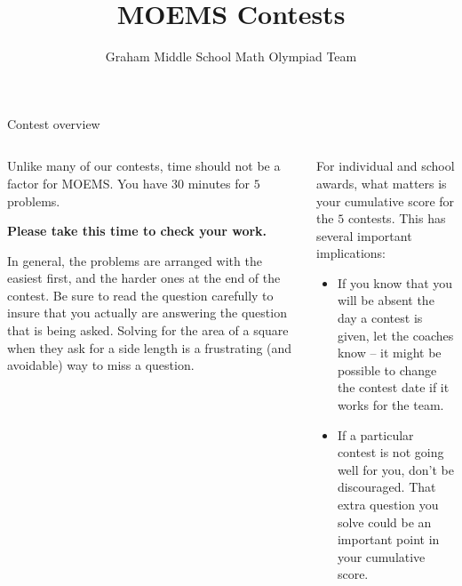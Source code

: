 \documentclass[9pt,aspectratio=169]{beamer}
\title{MOEMS Contests}
\subtitle[Graham Middle School]{Graham Middle School Math Olympiad Team}
\begin{document}
\maketitle

\begin{frame}{Contest overview}
  \begin{columns}[T]
    \begin{column}{0.5\textwidth}
      \begin{definition}
        Unlike many of our contests, time should not be a factor for MOEMS.  You have $30$ minutes for $5$ problems.
        
        \textbf{Please take this time to check your work.}
      \end{definition}

      In general, the problems are arranged with the easiest first, and the harder ones at the end of the contest.  Be sure to read the question carefully to insure that you actually are answering the question that is being asked.  Solving for the area of a square when they ask for a side length is a frustrating (and avoidable) way to miss a question.

    \end{column}
    \begin{column}{0.5\textwidth}
      For individual and school awards, what matters is your cumulative score for the $5$ contests.  This has several important implications:
      \begin{itemize}
        \item If you know that you will be absent the day a contest is given, let the coaches know -- it might be possible to change the contest date if it works for the team.
        \item If a particular contest is not going well for you, don’t be discouraged.  That extra question you solve could be an important point in your cumulative score.
      \end{itemize}
    \end{column}
  \end{columns}
\end{frame}
\end{document}
